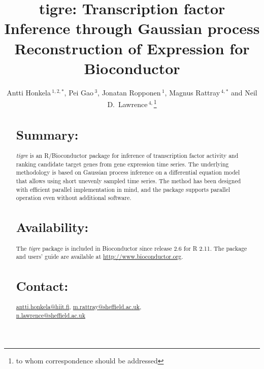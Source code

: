\documentclass{bioinfo}
\newcommand{\tigre}{\emph{tigre}}
\begin{document}

\title[tigre]{tigre: Transcription factor Inference through Gaussian process Reconstruction of Expression for Bioconductor}
\author[Honkela \textit{et~al.}]{Antti Honkela\,$^{1,2,*}$, Pei Gao\,$^{3}$, Jonatan Ropponen\,$^{1}$, Magnus Rattray\,$^{4,*}$ and Neil D.\ Lawrence\,$^{4,}$\footnote{to whom correspondence should be addressed}}
\address{$^{1}$Department of Information and Computer Science, Aalto
  University, Helsinki, Finland\\
  $^{2}$Helsinki Institute for Information Technology HIIT,
  University of Helsinki, Helsinki, Finland\\
  $^{3}$Department of of Public Health and Primary Care, University of
  Cambridge, Cambridge, UK\\
  $^{4}$ Sheffield Institute for Translational Neuroscience and
  Department of Computer Science, University of Sheffield, Sheffield, UK}



\maketitle

\begin{abstract}

\section{Summary:}
\tigre{} is an R/Bioconductor package for inference of transcription
factor activity and ranking candidate target genes from gene
expression time series.  The underlying methodology is based on
Gaussian process inference on a differential equation model that
allows using short unevenly sampled time series.  The method has been
designed with efficient parallel implementation in mind, and the
package supports parallel operation even without additional
software.

\section{Availability:}
The \tigre{} package is included in Bioconductor since release 2.6 for
R 2.11. The package and users' guide are available at
\href{http://www.bioconductor.org}{http://www.bioconductor.org}.

\section{Contact:} \href{antti.honkela@hiit.fi}{antti.honkela@hiit.fi},
\href{m.rattray@sheffield.ac.uk}{m.rattray@sheffield.ac.uk},\\
\href{n.lawrence@sheffield.ac.uk}{n.lawrence@sheffield.ac.uk}
\end{abstract}
\end{document}
